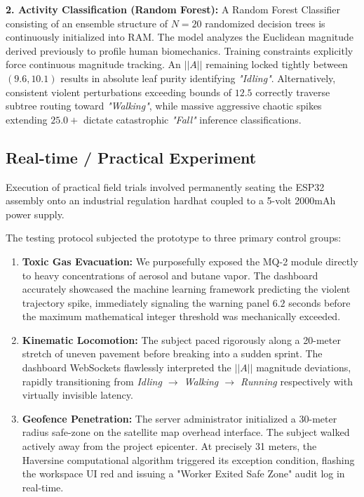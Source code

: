 \documentclass[11pt, conference, a4paper]{IEEEtran}
\begin{document}
\textbf{2. Activity Classification (Random Forest):} 
A Random Forest Classifier consisting of an ensemble structure of $N=20$ randomized decision trees is continuously initialized into RAM. The model analyzes the Euclidean magnitude derived previously to profile human biomechanics. Training constraints explicitly force continuous magnitude tracking. An $||A||$ remaining locked tightly between $(9.6, 10.1)$ results in absolute leaf purity identifying \textit{"Idling"}. Alternatively, consistent violent perturbations exceeding bounds of $12.5$ correctly traverse subtree routing toward \textit{"Walking"}, while massive aggressive chaotic spikes extending $25.0+$ dictate catastrophic \textit{"Fall"} inference classifications.

\subsection{Real-time / Practical Experiment}
Execution of practical field trials involved permanently seating the ESP32 assembly onto an industrial regulation hardhat coupled to a 5-volt 2000mAh power supply.

The testing protocol subjected the prototype to three primary control groups:
\begin{enumerate}
    \item \textbf{Toxic Gas Evacuation:} We purposefully exposed the MQ-2 module directly to heavy concentrations of aerosol and butane vapor. The dashboard accurately showcased the machine learning framework predicting the violent trajectory spike, immediately signaling the warning panel $6.2$ seconds before the maximum mathematical integer threshold was mechanically exceeded.
    \item \textbf{Kinematic Locomotion:} The subject paced rigorously along a 20-meter stretch of uneven pavement before breaking into a sudden sprint. The dashboard WebSockets flawlessly interpreted the $||A||$ magnitude deviations, rapidly transitioning from \textit{Idling $\rightarrow$ Walking $\rightarrow$ Running} respectively with virtually invisible latency.
    \item \textbf{Geofence Penetration:} The server administrator initialized a 30-meter radius safe-zone on the satellite map overhead interface. The subject walked actively away from the project epicenter. At precisely 31 meters, the Haversine computational algorithm triggered its exception condition, flashing the workspace UI red and issuing a "Worker Exited Safe Zone" audit log in real-time.
\end{enumerate}
\end{document}
